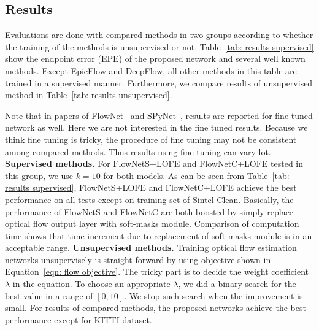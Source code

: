 \documentclass[10pt,twocolumn,letterpaper]{article}
\begin{document}
\subsection{Results}
Evaluations are done with compared methods in two groups according to whether the training of the methods is unsupervised or not. Table~\ref{tab: results supervised} show the endpoint error (EPE) of the proposed network and several well known methods. Except EpicFlow and DeepFlow, all other methods in this table are trained in a supervised manner. Furthermore, we compare results of unsupervised method in Table~\ref{tab: results unsupervised}.

Note that in papers of FlowNet~\cite{Ilg_2017_CVPR} and SPyNet~\cite{Ranjan_2017_CVPR}, results are reported for fine-tuned network as well. Here we are not interested in the fine tuned results. Because we think fine tuning is tricky, the procedure of fine tuning may not be consistent among compared methods. Thus results using fine tuning can vary lot.   
\newline
\newline
\noindent \textbf{Supervised methods.} For FlowNetS+LOFE and FlowNetC+LOFE tested in this group, we use $k=10$ for both models. As can be seen from Table~\ref{tab: results supervised}, FlowNetS+LOFE and FlowNetC+LOFE achieve the best performance on all tests except on training set of Sintel Clean. Basically, the performance of FlowNetS and FlowNetC are both boosted by simply replace optical flow output layer with soft-masks module. Comparison of computation time shows that time increment due to replacement of soft-masks module is in an acceptable range. 
\newline
\newline
\noindent \textbf{Unsupervised methods.} Training optical flow estimation networks unsupervisely is straight forward by using objective shown in Equation~\ref{eqn: flow objective}. The tricky part is to decide the weight coefficient $\lambda$ in the equation. To choose an appropriate $\lambda$, we did a binary search for the best value in a range of $[0, 10]$. We stop such search when the improvement is small. For results of compared methods, the proposed networks achieve the best performance except for KITTI dataset. 
\end{document}
